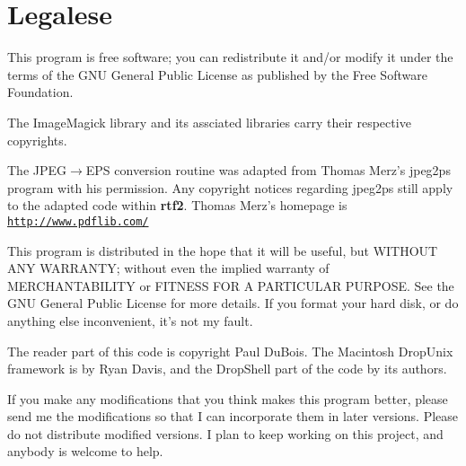\documentclass[11pt]{article}
\def\rtf2latex2e{{\bf rtf2\LaTeXe}}
\def\urlone#1{\mbox{\href{#1}{\tt #1}}}
\begin{document}
\section{Legalese}
This program is free software; you can redistribute it and/or
modify it under the terms of the GNU General Public License
as published by the Free Software Foundation.

The ImageMagick library and its assciated libraries carry their respective copyrights.

The JPEG{$\rightarrow$}EPS conversion routine was adapted from Thomas
Merz's jpeg2ps program with his permission. Any copyright notices
regarding jpeg2ps still apply to the adapted code within \rtf2latex2e.
Thomas Merz's homepage is \urlone{http://www.pdflib.com/}


This program is distributed in the hope that it will be useful, but
WITHOUT ANY WARRANTY; without even the implied warranty of
MERCHANTABILITY or FITNESS FOR A PARTICULAR PURPOSE. See the GNU
General Public License for more details.  If you format your hard
disk, or do anything else inconvenient, it's not my fault.

The reader part of this code is copyright Paul DuBois.  The Macintosh
DropUnix framework is by Ryan Davis, and the DropShell part of the
code by its authors.

If you make any modifications that you think makes this program
better, please send me the modifications so that I can incorporate
them in later versions.  Please do not distribute modified versions. 
I plan to keep working on this project, and anybody is welcome to
help.

    
\end{document}
